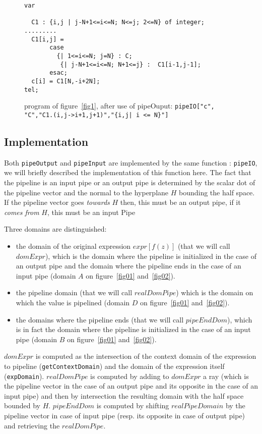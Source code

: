 \documentclass[a4paper,11pt]{article}
\begin{document}
\begin{figure}
\begin{verbatim}
var 
	
  C1 : {i,j | j-N+1<=i<=N; N<=j; 2<=N} of integer;
.........
  C1[i,j] = 
       case
         {| 1<=i<=N; j=N} : C;
          {| j-N+1<=i<=N; N+1<=j} :  C1[i-1,j-1];
       esac;
  c[i] = C1[N,-i+2N];
tel;
\end{verbatim}
\caption{program of figure~\ref{fig1}, after use of pipeOuput:
 {\tt pipeIO["c", "C","C1.(i,j->i+1,j+1)","\{i,j| i <= N\}"]}}
\label{fig3}
\end{figure}

\subsection{Implementation}
Both {\tt pipeOutput} and  {\tt pipeInput} are implemented
by the same function : {\tt pipeIO}, we will briefly described the 
implementation of this function here.
 The fact that the pipeline is an input pipe or an output pipe is
 determined by the scalar dot of the pipeline vector and 
the normal to the hyperplane $H$ bounding the half space.
If the pipeline vector goes {\em towards} $H$ then, this must be an output 
pipe, if it {\em comes from} $H$, this must be an input Pipe

Three domains are distinguished:
\begin{itemize}
 \item the domain of the original 
expression $expr[f(z)]$ (that we will call $domExpr$), 
which is the domain where
the pipeline is initialized in the case of an output pipe and the 
domain where the pipeline ends in the case of an input pipe 
(domain $A$ on figure~\ref{fig01} and~\ref{fig02}). 
\item the pipeline domain (that we will call $realDomPipe$) 
which is the domain  on which the value is pipelined 
(domain $D$ on figure~\ref{fig01} and~\ref{fig02}). 
\item the domains where the pipeline ends (that we will call $pipeEndDom$), 
which is in fact the domain where the pipeline is initialized in
 the case of an input pipe
(domain $B$ on figure~\ref{fig01} and~\ref{fig02}). 
\end{itemize}
$domExpr$ is computed as the intersection of the context domain of the
expression to pipeline ({\tt getContextDomain}) and the domain of the
expression itself ({\tt expDomain}). $realDomPipe$ is computed by
adding to $domExpr$ a ray (which is the pipeline vector in the case of
an output pipe and its opposite in the case of an input pipe) and then
by intersection the resulting domain with the half space bounded by 
 $H$. $pipeEndDom$ is computed by shifting $realPipeDomain$ by
the pipeline vector in case of input pipe (resp. its opposite in case
of output pipe) and retrieving the $realDomPipe$.
\end{document}
